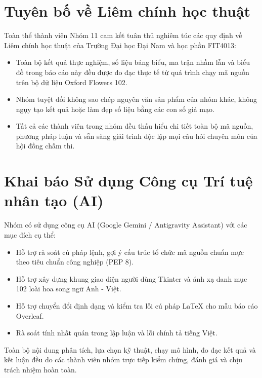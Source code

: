 \documentclass[../DoAn.tex]{subfiles}
\begin{document}
\section{Tuyên bố về Liêm chính học thuật}
Toàn thể thành viên Nhóm 11 cam kết tuân thủ nghiêm túc các quy định về Liêm chính học thuật của Trường Đại học Đại Nam và học phần FIT4013:
\begin{itemize}
    \item Toàn bộ kết quả thực nghiệm, số liệu bảng biểu, ma trận nhầm lẫn và biểu đồ trong báo cáo này đều được đo đạc thực tế từ quá trình chạy mã nguồn trên bộ dữ liệu Oxford Flowers 102.
    \item Nhóm tuyệt đối không sao chép nguyên văn sản phẩm của nhóm khác, không ngụy tạo kết quả hoặc làm đẹp số liệu bằng các con số giả mạo.
    \item Tất cả các thành viên trong nhóm đều thấu hiểu chi tiết toàn bộ mã nguồn, phương pháp luận và sẵn sàng giải trình độc lập mọi câu hỏi chuyên môn của hội đồng chấm thi.
\end{itemize}

\section{Khai báo Sử dụng Công cụ Trí tuệ nhân tạo (AI)}
Nhóm có sử dụng công cụ AI (Google Gemini / Antigravity Assistant) với các mục đích cụ thể:
\begin{itemize}
    \item Hỗ trợ rà soát cú pháp lệnh, gợi ý cấu trúc tổ chức mã nguồn chuẩn mực theo tiêu chuẩn công nghiệp (PEP 8).
    \item Hỗ trợ xây dựng khung giao diện người dùng Tkinter và ánh xạ danh mục 102 loài hoa song ngữ Anh - Việt.
    \item Hỗ trợ chuyển đổi định dạng và kiểm tra lỗi cú pháp LaTeX cho mẫu báo cáo Overleaf.
    \item Rà soát tính nhất quán trong lập luận và lỗi chính tả tiếng Việt.
\end{itemize}
Toàn bộ nội dung phân tích, lựa chọn kỹ thuật, chạy mô hình, đo đạc kết quả và kết luận đều do các thành viên nhóm trực tiếp kiểm chứng, đánh giá và chịu trách nhiệm hoàn toàn.
\end{document}
